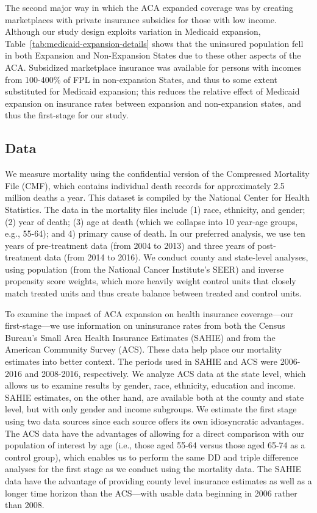 \documentclass[12pt]{article}%
\begin{document}
The second major way in which the ACA expanded coverage was by creating marketplaces with private insurance subsidies for those with low income. 
Although our study design exploits variation in Medicaid expansion, Table~\ref{tab:medicaid-expansion-details} shows that the uninsured population fell in both Expansion and Non-Expansion States due to these other aspects of the ACA. 
Subsidized marketplace insurance was available for persons with incomes from 100-400\% of FPL in non-expansion States, and thus to some extent substituted for Medicaid expansion; this reduces the relative effect of Medicaid expansion on insurance rates between expansion and non-expansion states, and thus the first-stage for our study. 

\subsection{Data}

We measure mortality using the confidential version of the Compressed Mortality File (CMF), which contains individual death records for approximately 2.5 million deaths a year.   
This dataset is compiled by the National Center for Health Statistics. 
The data in the mortality files include (1) race, ethnicity, and gender; (2) year of death; (3) age at death (which we collapse into 10 year-age groups, e.g., 55-64); and 4) primary cause of death. 
In our preferred analysis, we use ten years of pre-treatment data (from 2004 to 2013) and three years of post-treatment data (from 2014 to 2016). 
We conduct county and state-level analyses, using population (from the National Cancer Institute's SEER) and inverse propensity  score weights, which more heavily weight control units that closely match treated units and thus create balance between treated and control units. 

To examine the impact of ACA expansion on health insurance coverage---our first-stage---we use information on uninsurance rates from both the Census Bureau's Small Area Health Insurance Estimates (SAHIE) and from the American Community Survey (ACS).
These data help place our mortality estimates into better context. 
The periods used in SAHIE and ACS were 2006-2016 and 2008-2016, respectively. 
We analyze ACS data at the state level, which allows us to examine results by gender, race, ethnicity, education and income. 
SAHIE estimates, on the other hand, are available both at the county and state level, but with only gender and income subgroups.
We estimate the first stage using two data sources since each source offers its own idiosyncratic advantages.
The ACS data have the advantages of allowing for a direct comparison with our population of interest by age (i.e., those aged 55-64 versus those aged 65-74 as a control group), which enables us to perform the same DD and triple difference analyses for the first  stage as we conduct using the mortality data.
The SAHIE data have the advantage of providing county level insurance estimates as well as a longer time horizon than the ACS---with usable data beginning in 2006 rather than 2008.
\end{document}
